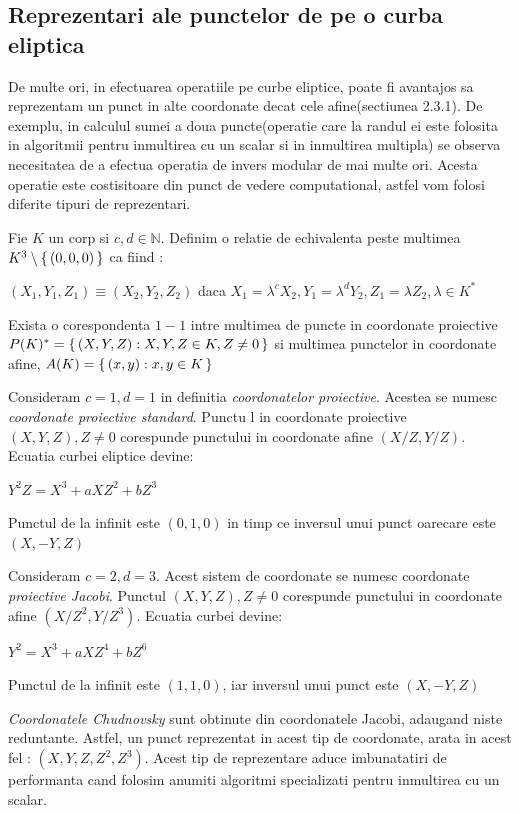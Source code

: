 \subsection{Reprezentari ale punctelor de pe o curba eliptica}
\label{subsec:subsec02}
De multe ori, in efectuarea operatiile pe curbe eliptice, poate fi avantajos sa reprezentam un punct in alte coordonate decat cele afine(sectiunea 2.3.1). De exemplu, in calculul sumei a doua puncte(operatie care la randul ei este folosita in algoritmii pentru inmultirea cu un scalar si in inmultirea multipla) se observa necesitatea de a efectua operatia de invers modular de mai multe ori. Acesta operatie este costisitoare din punct de vedere computational, astfel vom folosi diferite tipuri de reprezentari.
\begin{dfn}
Fie $K$ un corp si $c, d\in \mathbb{N}$. Definim o relatie de echivalenta peste multimea $K^3\setminus \set {(0, 0, 0)}$ ca fiind :
\begin{center} $(X_1, Y_1, Z_1) \equiv (X_2, Y_2, Z_2)$ daca $X_1 = \lambda ^cX_2, Y_1 = \lambda ^d Y_2, Z_1 = \lambda Z_2, \lambda\in K^{*}$\end{center}
Exista o corespondenta $1-1$ intre multimea de puncte in coordonate proiective $P(K)^{*} = \set {(X, Y, Z): X, Y, Z\in K, Z\neq 0}$ si multimea punctelor in coordonate afine, $A(K) = \set {(x, y): x, y\in K}$
\end{dfn}
\begin{dfn}
Consideram $c=1, d=1$ in definitia \textit{coordonatelor proiective}. Acestea se numesc \textit{coordonate proiective standard}. Punctu l in coordonate proiective $(X, Y, Z), Z\neq 0$ corespunde punctului in coordonate afine $(X/Z, Y/Z)$. Ecuatia curbei eliptice devine:
\begin{center}  $Y^2Z = X^3 + aXZ^2 + bZ^3$ \end{center}
Punctul de la infinit este $(0, 1, 0)$ in timp ce inversul unui punct oarecare este $(X, -Y, Z)$
\end{dfn}
\begin{dfn}
Consideram $c=2, d=3$. Acest sistem de coordonate se numesc coordonate \textit{proiective Jacobi}. Punctul $(X, Y, Z), Z\neq 0$ corespunde punctului 
in coordonate afine $(X/Z^2, Y/Z^3)$. Ecuatia curbei devine:
\begin{center} $Y^2 = X^3 + aXZ^4 + bZ^6$ \end{center}
Punctul de la infinit este $(1, 1, 0)$, iar inversul unui punct este $(X, -Y, Z)$
\end{dfn}
\begin{dfn}
\textit{Coordonatele Chudnovsky} sunt obtinute din coordonatele Jacobi, adaugand niste reduntante. Astfel, un punct reprezentat in acest tip de coordonate, arata in acest fel : $(X, Y, Z, Z^2, Z^3)$. Acest tip de reprezentare aduce imbunatatiri de performanta cand folosim anumiti algoritmi specializati pentru inmultirea cu un scalar.
\end{dfn}

